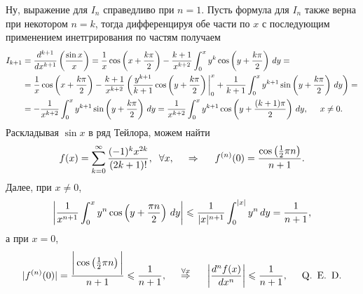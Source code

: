 Ну, выражение для $I_n$ справедливо при $n=1$. Пусть формула для $I_n$ также верна при некотором $n=k$, тогда дифференцируя обе части по $x$ с последующим применением инетгрирования по частям получаем
\begin{align*}
    I_{k+1} 
    &=
     \frac{d^{k+1}}{d x^{k+1}} \left(\frac{\sin x}{x}\right) = \frac{1}{x} \cos \left(
        x + \frac{k \pi}{2}
    \right) - \frac{k+1}{x^{k+2}} \int_0^x y^k \cos \left(
        y + \frac{k\pi}{2}
    \right) \d y = \\
    &= 
    \frac{1}{x} \cos \left(
        x + \frac{k \pi}{2}
    \right) - \frac{k+1}{x^{k+2}} \left(
        \frac{y^{k+1}}{k+1} \cos \left(y + \frac{k \pi}{2}\right) \bigg|_0^x 
        + \frac{1}{k+1} \int_0^x y^{k+1} \sin\left(y + \frac{k \pi}{2}\right)\d y
    \right) = \\
    &=
    -\frac{1}{x^{k+2}} \int_0^x y^{k+1} \sin \left(
        y + \frac{k \pi}{2}
    \right) \d y = \frac{1}{x^{k+2}} \int_0^x y^{k+1} \cos \left(
        y + \frac{(k+1)\pi}{2}
    \right) \d y,
    \hspace{5 mm}
    x \neq 0.
\end{align*}
Раскладывая $\sin x$ в ряд Тейлора, можем найти
\begin{equation*}
    f(x) = \sum_{k=0}^{\infty} \frac{(-1)^k x^{2k}}{(2k + 1)!}, \hspace{2 mm} \forall x,
    \hspace{0.5cm} \Rightarrow \hspace{0.5cm}  
    f^{(n)}  (0) = \frac{\cos \left(\frac{1}{2} \pi n\right)}{n+1}.
\end{equation*}
Далее, при $x \neq 0$, 
\begin{equation*}
    \bigg|
        \frac{1}{x^{n+1}} \int_0^x y^n \cos\left(
            y + \frac{\pi n}{2}
        \right) \d y
    \bigg| \leq 
    \frac{1}{|x|^{n+1}} \int_0^{|x|} y^n \d y = \frac{1}{n+1},
\end{equation*}
а при $x = 0$,
\begin{equation*}
    |f^{(n)} (0)| = \frac{\bigg|
        \cos \left( \frac{1}{2} \pi n\right)
    \bigg|}{n + 1} \leq \frac{1}{n+1}, 
    \hspace{0.5cm} \overset{\forall x}{\Rightarrow}  \hspace{0.5cm}
    \bigg|
        \frac{d^n f(x)}{d x^n}
    \bigg| \leq \frac{1}{n+1},
    \hspace{5 mm}
    \textnormal{Q.\, E.\, D.}
\end{equation*}